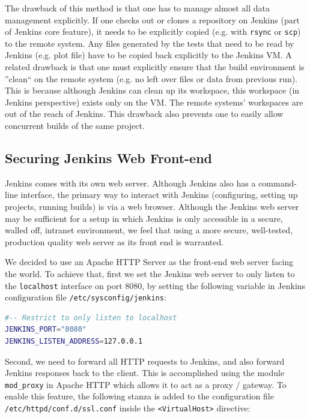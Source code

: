 \documentclass[10pt, conference, compsocconf]{IEEEtran}
\begin{document}
The drawback of this method is that one has to manage almost all data management explicitly. 
If one checks out or clones a repository on Jenkins (part of Jenkins core feature), it needs to be explicitly copied (e.g. with \texttt{rsync} or \texttt{scp}) to the remote system. 
Any files generated by the tests that need to be read by Jenkins (e.g. plot file) have to be copied back explicitly to the Jenkins VM. 
A related drawback is that one must explicitly ensure that the build environment is ''clean`` on the remote system (e.g. no left over files or data from previous run). 
This is because although Jenkins can clean up its workspace, this workspace (in Jenkins perspective) exists only on the VM. 
The remote systems' workspaces are out of the reach of Jenkins. 
This drawback also prevents one to easily allow concurrent builds of the same project. 



\subsection{Securing Jenkins Web Front-end}

Jenkins comes with its own web server. 
Although Jenkins also has a command-line interface, the primary way to interact with Jenkins (configuring, setting up projects, running builds) is via a web browser. 
Although the Jenkins web server may be sufficient for a setup in which Jenkins is only accessible in a secure, walled off, intranet environment, we feel that using a more secure, well-tested, production quality web server as its front end is warranted.

We decided to use an Apache HTTP Server as the front-end web server facing the world. 
To achieve that, first we set the Jenkins web server to only listen to the \texttt{localhost} interface on port 8080, by setting the following variable in Jenkins configuration file \texttt{/etc/sysconfig/jenkins}:
\begin{lstlisting}[captionpos=t,language=bash,label=lst:jenkinsConfig]
#-- Restrict to only listen to localhost
JENKINS_PORT="8080"
JENKINS_LISTEN_ADDRESS=127.0.0.1
\end{lstlisting}

Second, we need to forward all HTTP requests to Jenkins, and also forward Jenkins responses back to the client. 
This is accomplished using the module \texttt{mod_proxy} \cite{ApacheModProxy} in Apache HTTP which allows it to act as a proxy / gateway. 
To enable this feature, the following stanza is added to the configuration file \texttt{/etc/httpd/conf.d/ssl.conf} inside the \texttt{<VirtualHost>} directive:
\end{document}
